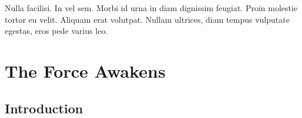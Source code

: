 \graphicspath{{figures/appendix/}}

\begin{savequote}[75mm]
Nulla facilisi. In vel sem. Morbi id urna in diam dignissim feugiat. Proin molestie tortor eu velit. Aliquam erat volutpat. Nullam    ultrices, diam tempus vulputate egestas, eros pede varius leo.
\end{savequote}

\chapter{The Force Awakens}
\label{appendix_1}


\section{Introduction}

\lipsum[50-55]
